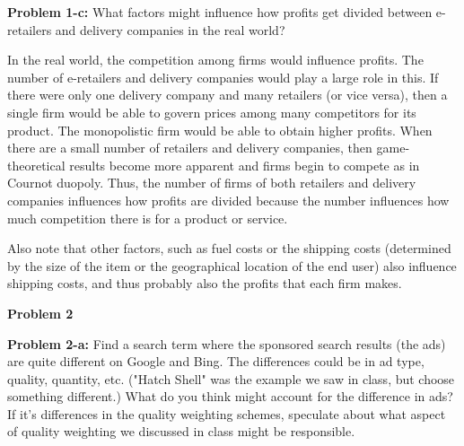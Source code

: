 \documentclass[psamsfonts]{amsart}
\newenvironment{sol}{\vspace{0.25cm}{\large \bfseries Solution:}}{\qedsymbol}
\newenvironment{prob}[1]{\begin{framed}{\large \bfseries Problem #1:}}{\end{framed}}
\begin{document}
\begin{prob}{1-c}
What factors might influence how profits get divided between e-retailers and delivery companies in the real world?
\end{prob}
\begin{sol}
In the real world, the competition among firms would influence profits. The number of e-retailers and delivery companies would play a large role in this. If there were only one delivery company and many retailers (or vice versa), then a single firm would be able to govern prices among many competitors for its product. The monopolistic firm would be able to obtain higher profits. When there are a small number of retailers and delivery companies, then game-theoretical results become more apparent and firms begin to compete as in Cournot duopoly. Thus, the number of firms of both retailers and delivery companies influences how profits are divided because the number influences how much competition there is for a product or service. 

Also note that other factors, such as fuel costs or the shipping costs (determined by the size of the item or the geographical location of the end user) also influence shipping costs, and thus probably also the profits that each firm makes.
\end{sol}

\vspace{1cm}
\begin{center}
{\Large \bfseries Problem 2}
\end{center}

\begin{prob}{2-a}
Find a search term where the sponsored search results (the ads) are quite different on Google and Bing.  The differences could be in ad type, quality, quantity, etc.  ("Hatch Shell" was the example we saw in class, but choose something different.)  What do you think might account for the difference in ads?  If it's differences in the quality weighting schemes, speculate about what aspect of quality weighting we discussed in class might be responsible.
\end{prob}
\end{document}
